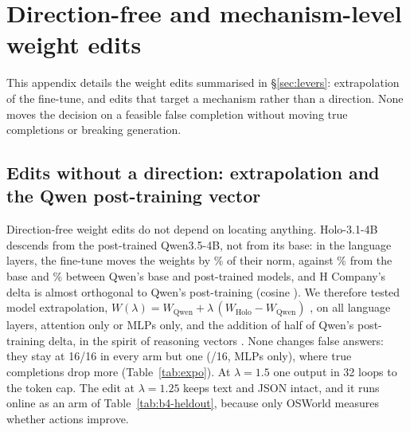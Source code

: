 \section{Direction-free and mechanism-level weight edits}
\label{app:edits}
This appendix details the weight edits summarised in \S\ref{sec:levers}: extrapolation of the fine-tune, and edits that target a mechanism rather than a direction. None moves the decision on a feasible false completion without moving true completions or breaking generation.

\subsection{Edits without a direction: extrapolation and the Qwen post-training vector}
\label{sec:expo}
Direction-free weight edits do not depend on locating anything. Holo-3.1-4B descends from the post-trained Qwen3.5-4B, not from its base: in the language layers, the fine-tune moves the weights by \linHoloQ\% of their norm, against \linHoloBase\% from the base and \linQBase\% between Qwen's base and post-trained models, and H Company's delta is almost orthogonal to Qwen's post-training (cosine \linCos). %
We therefore tested model extrapolation, $W(\lambda)=W_{\text{Qwen}}+\lambda\,(W_{\text{Holo}}-W_{\text{Qwen}})$ \citep{zheng2024expo}, on all language layers, attention only or MLPs only, and the addition of half of Qwen's post-training delta, in the spirit of reasoning vectors \citep{zbeeb2025reasoningvectors}. None changes false answers: they stay at 16/16 in every arm but one (\expoFspMin/16, MLPs only), where true completions drop more (Table~\ref{tab:expo}). At $\lambda=1.5$ one output in 32 loops to the token cap. The edit at $\lambda=1.25$ keeps text and JSON intact, and it runs online as an arm of Table~\ref{tab:b4-heldout}, because only OSWorld measures whether actions improve.


